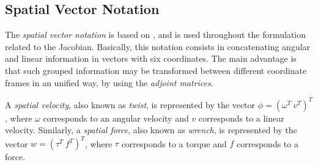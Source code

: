 \documentclass[tog]{acmsiggraph}
\begin{document}
\newpage

\appendix


\subsection{Spatial Vector Notation}\label{ap:notacao6D}

The \textit{spatial vector notation} is based on \cite{bib:Cline99,bib:NunesTese12},
and is used throughout the formulation related to the Jacobian.
Basically, this notation consists in concatenating angular and linear information in vectors with six coordinates.
The main advantage is that such grouped information may be transformed between different coordinate frames in an unified way,
by using the \textit{adjoint matrices}.

A \textit{spatial velocity}, also known as \emph{twist}, is represented by the vector $\phi = (\omega^T ~ v^T)^T$,
where $\omega$ corresponds to an angular velocity and $v$ corresponds to a linear velocity.
Similarly, a \textit{spatial force}, also known as \emph{wrench}, is represented by the vector
$w = (\tau^T ~ f^T)^T$, where $\tau$ corresponds to a torque and $f$ corresponds to a force.
\end{document}
